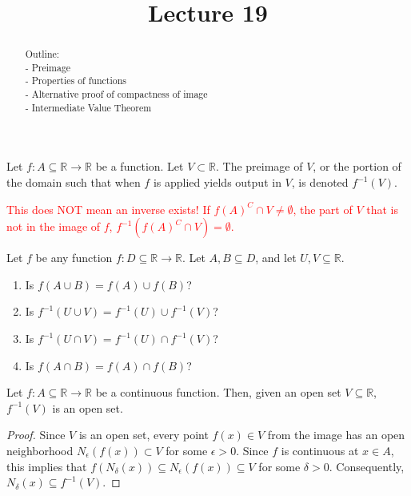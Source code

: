 \documentclass{ximera}
\begin{document}
    \title{Lecture 19}
    
    \begin{abstract}  
    Outline: \\
    - Preimage \\
    - Properties of functions \\
    - Alternative proof of compactness of image \\
    - Intermediate Value Theorem
\end{abstract}

\maketitle



\begin{definition}
    Let $f :A \subseteq \mathbb{R} \to \mathbb{R}$ be a function.  Let $V \subset \mathbb{R}$.  The preimage of $V$, or the portion of the domain such that when $f$ is applied yields output in $V$, is denoted $f^{-1}(V)$. 
\end{definition}

\textcolor{red}{This does NOT mean an inverse exists!}
\textcolor{red}{If $f(A)^C \cap V \neq \emptyset$, the part of $V$ that is not in the image of $f$, $f^{-1}(f(A)^C \cap V) = \emptyset$.}

\begin{exercise}
    Let $f$ be any function $f:D\subseteq \mathbb{R} \to \mathbb{R}$.  Let $A, B \subseteq D$, and let $U,V \subseteq \mathbb{R}$.
    \begin{enumerate}
        \item Is $f(A\cup B) = f(A) \cup f(B)$?
        \item Is $f^{-1}(U\cup V) = f^{-1}(U) \cup f^{-1}(V)$?
        \item Is $f^{-1}(U\cap V) = f^{-1}(U) \cap f^{-1}(V)$?
        \item Is $f(A\cap B) = f(A) \cap f(B)$?
    \end{enumerate}
\end{exercise}

\begin{theorem}
    Let $f: A\subseteq  \mathbb{R} \to \mathbb{R}$ be a continuous function.  Then, given an open set $V \subseteq \mathbb{R}$, $f^{-1}(V)$ is an open set.
\end{theorem}
\begin{proof}
    Since $V$ is an open set, every point $f(x) \in V$ from the image has an open neighborhood $N_\epsilon(f(x))\subset V$ for some $\epsilon > 0$.  Since $f$ is continuous at $x \in A$, this implies that $f(N_\delta(x)) \subseteq N_\epsilon(f(x)) \subseteq V$ for some $\delta > 0$.  Consequently, $N_\delta(x) \subseteq f^{-1}(V)$.
\end{proof}
\end{document}
